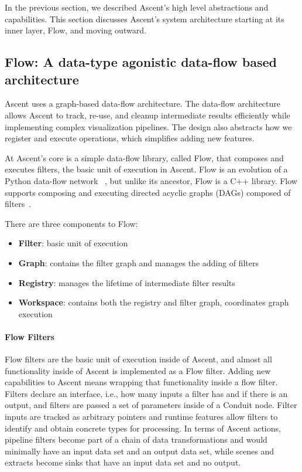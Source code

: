 In the previous section, we described Ascent's high level abstractions and
capabilities.
%
This section discusses Ascent's system architecture starting at its inner layer, Flow,
and moving outward.

\subsection{Flow: A data-type agonistic data-flow based architecture}
Ascent uses a graph-based data-flow architecture.
The data-flow architecture allows Ascent to track, re-use, and cleanup intermediate
results efficiently while implementing complex visualization pipelines.
The design also abstracts how we register and execute operations,
which simplifies adding new features.

At Ascent's core is a simple data-flow library, called Flow, that
composes and executes filters, the basic unit of execution in Ascent.
%
Flow is an evolution of a Python data-flow network
~\cite{flow_reference}, but unlike its ancestor, Flow is a C++
library.
%
Flow supports composing and executing directed acyclic graphs
(DAGs) composed of filters~\cite{LarsenAscent}.

There are three components to Flow:
\begin{itemize}
  \item \textbf{Filter}: basic unit of execution
  \item \textbf{Graph}: contains the filter graph and manages the adding of filters
  \item \textbf{Registry}: manages the lifetime of intermediate filter results
  \item \textbf{Workspace}: contains both the registry and filter graph, coordinates graph execution
\end{itemize}

\paragraph{Flow Filters}
Flow filters are the basic unit of execution inside of Ascent, and
almost all functionality inside of Ascent is implemented as a Flow filter.
%
Adding new capabilities to Ascent means wrapping that functionality inside
a flow filter.
%
Filters declare an interface, i.e., how many inputs a filter has and
if there is an output, and filters are passed a set of parameters inside
of a Conduit
node.
%
Filter inputs are tracked as arbitrary pointers and runtime features allow
filters to identify and obtain concrete types for processing.
%
In terms of Ascent actions, pipeline filters become part of a chain of
data transformations and would minimally have an input
data set and an output data set, while scenes and extracts
become sinks that have an input data set and no output.
%

